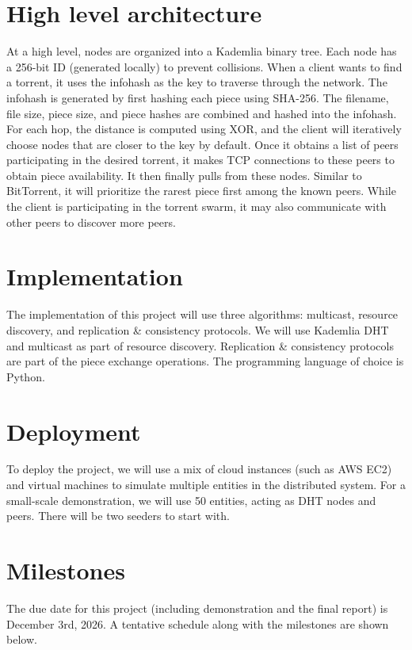\section{High level architecture}
At a high level, nodes are organized into a Kademlia binary tree. Each node has a 256-bit ID (generated locally) to prevent collisions.
When a client wants to find a torrent, it uses the infohash as the key to traverse through the network.
The infohash is generated by first hashing each piece using SHA-256. The filename, file size, piece size, and piece hashes are combined and hashed into the infohash.
For each hop, the distance is computed using XOR, and the client will iteratively choose nodes that are closer to the key by default.
Once it obtains a list of peers participating in the desired torrent, it makes TCP connections to these peers to obtain piece availability. It then finally pulls from these nodes.
Similar to BitTorrent, it will prioritize the rarest piece first among the known peers.
While the client is participating in the torrent swarm, it may also communicate with other peers to discover more peers.

\section{Implementation}
The implementation of this project will use three algorithms: multicast, resource discovery, and replication \& consistency protocols.
We will use Kademlia DHT and multicast as part of resource discovery. Replication \& consistency protocols are part of the piece exchange operations.
The programming language of choice is Python.

\section{Deployment}
To deploy the project, we will use a mix of cloud instances (such as AWS EC2) and virtual machines to simulate multiple entities in the distributed system.
For a small-scale demonstration, we will use 50 entities, acting as DHT nodes and peers. There will be two seeders to start with.

\section{Milestones}
The due date for this project (including demonstration and the final report) is December 3rd, 2026. A tentative schedule along with the milestones are shown below.

